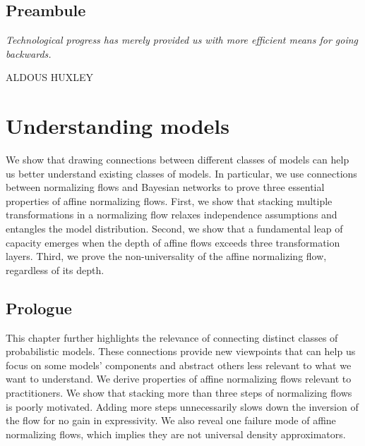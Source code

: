 \thispagestyle{empty}
\section*{Preambule}

\vfill

{
\textit{\justify
   Technological progress has merely provided us with more efficient means for going backwards.}

  \par\bigskip
  \raggedleft\MakeUppercase{Aldous Huxley}
  \par%
}


\chapter{Understanding models}\label{ch:04}

\begin{chapter_outline}

  We show that drawing connections between different classes of models can help us better understand existing classes of models.
  In particular, we use connections between normalizing flows and Bayesian networks to prove three essential properties of affine normalizing flows.
  First, we show that stacking multiple transformations in a normalizing flow relaxes independence assumptions and entangles the model distribution.
  Second, we show that a fundamental leap of capacity emerges when the depth of affine flows exceeds three transformation layers.
  Third, we prove the non-universality of the affine normalizing flow, regardless of its depth.
\end{chapter_outline}

\section{Prologue}
This chapter further highlights the relevance of connecting distinct classes of probabilistic models. These connections provide new viewpoints that can help us focus on some models' components and abstract others less relevant to what we want to understand. We derive properties of affine normalizing flows relevant to practitioners. We show that stacking more than three steps of normalizing flows is poorly motivated. Adding more steps unnecessarily slows down the inversion of the flow for no gain in expressivity. We also reveal one failure mode of affine normalizing flows, which implies they are not universal density approximators.


